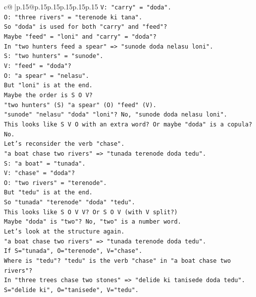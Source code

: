 \documentclass{article}
\begin{document}
{\begin{supertabular}{c@{$\;$}|p{.15\linewidth}@{}p{.15\linewidth}p{.15\linewidth}p{.15\linewidth}p{.15\linewidth}p{.15\linewidth}}
{{{\texttt{V: "carry" = "doda".} \\
\texttt{O: "three rivers" = "terenode ki tana".} \\
\texttt{So "doda" is used for both "carry" and "feed"?} \\
\texttt{Maybe "feed" = "loni" and "carry" = "doda"?} \\
\texttt{In "two hunters feed a spear" => "sunode doda nelasu loni".} \\
\texttt{S: "two hunters" = "sunode".} \\
\texttt{V: "feed" = "doda"?} \\
\texttt{O: "a spear" = "nelasu".} \\
\texttt{But "loni" is at the end.} \\
\texttt{Maybe the order is S O V?} \\
\texttt{"two hunters" (S) "a spear" (O) "feed" (V).} \\
\texttt{"sunode" "nelasu" "doda" "loni"? No, "sunode doda nelasu loni".} \\
\texttt{This looks like S V O with an extra word? Or maybe "doda" is a copula? No.} \\
\texttt{Let's reconsider the verb "chase".} \\
\texttt{"a boat chase two rivers" => "tunada terenode doda tedu".} \\
\texttt{S: "a boat" = "tunada".} \\
\texttt{V: "chase" = "doda"?} \\
\texttt{O: "two rivers" = "terenode".} \\
\texttt{But "tedu" is at the end.} \\
\texttt{So "tunada" "terenode" "doda" "tedu".} \\
\texttt{This looks like S O V V? Or S O V (with V split?)} \\
\texttt{Maybe "doda" is "two"? No, "two" is a number word.} \\
\texttt{Let's look at the structure again.} \\
\texttt{"a boat chase two rivers" => "tunada terenode doda tedu".} \\
\texttt{If S="tunada", O="terenode", V="chase".} \\
\texttt{Where is "tedu"? "tedu" is the verb "chase" in "a boat chase two rivers"?} \\
\texttt{In "three trees chase two stones" => "delide ki tanisede doda tedu".} \\
\texttt{S="delide ki", O="tanisede", V="tedu".} \\
}}}
\end{supertabular}}
\end{document}
